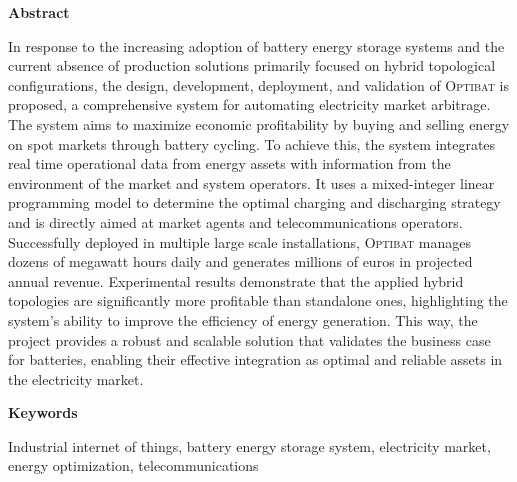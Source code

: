 \begin{center}
  {\bf \huge Abstract}
\end{center}

\vspace{1cm}

In response to the increasing adoption of battery energy storage systems and the current absence of production solutions primarily focused on hybrid topological configurations, the design, development, deployment, and validation of \textsc{Optibat} is proposed, a comprehensive system for automating electricity market arbitrage. The system aims to maximize economic profitability by buying and selling energy on spot markets through battery cycling. To achieve this, the system integrates real time operational data from energy assets with information from the environment of the market and system operators. It uses a mixed-integer linear programming model to determine the optimal charging and discharging strategy and is directly aimed at market agents and telecommunications operators. Successfully deployed in multiple large scale installations, \textsc{Optibat} manages dozens of megawatt hours daily and generates millions of euros in projected annual revenue. Experimental results demonstrate that the applied hybrid topologies are significantly more profitable than standalone ones, highlighting the system's ability to improve the efficiency of energy generation. This way, the project provides a robust and scalable solution that validates the business case for batteries, enabling their effective integration as optimal and reliable assets in the electricity market.

\vspace{1cm}

\begin{center}
  {\bf \large Keywords}
\end{center}

\vspace{0.5cm}

Industrial internet of things, battery energy storage system, electricity market, energy optimization, telecommunications
